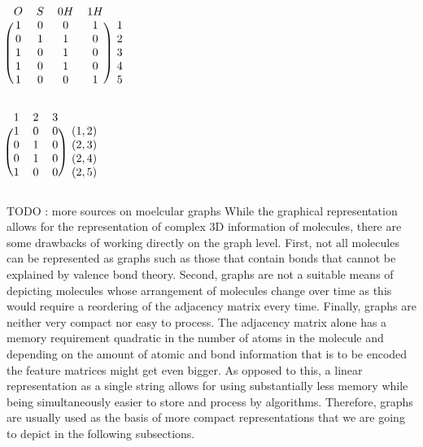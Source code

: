 \begin{minipage}{0.45\textwidth}
	\centering
	$
	\begin{blockarray}{ccccc}
	O & S & 0H & 1H  \\
	\begin{block}{(cccc)c}
	1 & 0 & 0 & 1 &  1 \\
	0 & 1 & 1 & 0 & 2 \\
	1 & 0 & 1 & 0 &  3 \\
	1 & 0 & 1 & 0 &  4 \\
	1 & 0 & 0 & 1 &  5 \\
	\end{block}
	\end{blockarray}
	$
	\label{fig:mol_node_feature_matrix}
\end{minipage}
\hfill
\begin{minipage}{0.45\textwidth}
	\vspace{.1cm}
	\centering
	$
	\begin{blockarray}{cccc}
	1 & 2 & 3  \\
	\begin{block}{(ccc)c}
	1 & 0 & 0 &  (1,2) \\
	0 & 1 & 0 &  (2,3) \\
	0 & 1 & 0 &  (2,4) \\
	1 & 0 & 0 &  (2,5) \\
	\end{block}
	\end{blockarray}
	$
	\label{fig:mol_edge_feature_matrix}
\end{minipage}
\newline\newline
TODO : more sources on moelcular graphs 
While the graphical representation allows for the representation of complex 3D information of molecules, there are some drawbacks of working directly on the graph level. First, not all molecules can be represented as graphs \citep{molrep} such as those that contain bonds that cannot be explained by valence bond theory. Second, graphs are not a suitable means of depicting molecules whose arrangement of molecules change over time as this would require a reordering of the adjacency matrix every time. Finally, graphs are neither very compact nor easy to process. The adjacency matrix alone has a memory requirement quadratic in the number of atoms in the molecule and depending on the amount of atomic and bond information that is to be encoded the feature matrices might get even bigger. As opposed to this, a linear representation as a single string allows for using substantially less memory while being simultaneously easier to store and process by algorithms. Therefore, graphs are usually used as the basis of more compact representations that we are going to depict in the following subsections. 

